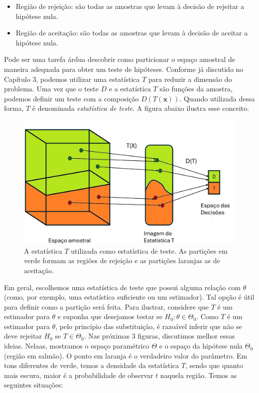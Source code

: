 \documentclass[
  letterpaper,
  DIV=11,
  numbers=noendperiod]{scrartcl}
\begin{document}
\begin{itemize}
\item
  Região de rejeição: são todas as amostras que levam à decisão de
  rejeitar a hipótese nula.
\item
  Região de aceitação: são todas as amostras que levam à decisão de
  aceitar a hipótese nula.
\end{itemize}

Pode ser uma tarefa árdua descobrir como particionar o espaço amostral
de maneira adequada para obter um teste de hipóteses. Conforme já
discutido no Capítulo 3, podemos utilizar uma estatística \(T\) para
reduzir a dimensão do problema. Uma vez que o teste \(D\) e a
estatística \(T\) são funções da amostra, podemos definir um teste com a
composição \(D(T(\textbf{x}))\). Quando utilizada dessa forma, \(T\) é
denominada \emph{estatística de teste}. A figura abaixo ilustra esse
conceito.

\begin{figure}

{\centering \includegraphics{fig_stat_test.jpg}

}

\caption{A estatística \(T\) utilizada como estatística de teste. As
partições em verde formam as regiões de rejeição e as partições laranjas
as de aceitação.}

\end{figure}%

Em geral, escolhemos uma estatística de teste que possui alguma relação
com \(\theta\) (como, por exemplo, uma estatística suficiente ou um
estimador). Tal opção é útil para definir como a partição será feita.
Para ilustrar, considere que \(T\) é um estimador para \(\theta\) e
suponha que desejamos testar se \(H_0:\theta\in \Theta_0\). Como \(T\) é
um estimador para \(\theta\), pelo princípio das substituição, é
razoável inferir que não se deve rejeitar \(H_0\) se \(T\in\Theta_0.\)
Nas próximas 3 figuras, discutimos melhor essas ideias. Nelaas,
mostramos o espaço paramétrico \(\Theta\) e o espaço da hipótese nula
\(\Theta_0\) (região em salmão). O ponto em laranja é o verdadeiro valor
do parâmetro. Em tons diferentes de verde, temos a densidade da
estatística \(T\), sendo que quanto mais escura, maior é a probabilidade
de observar \(t\) naquela região. Temos as seguintes situações:
\end{document}
